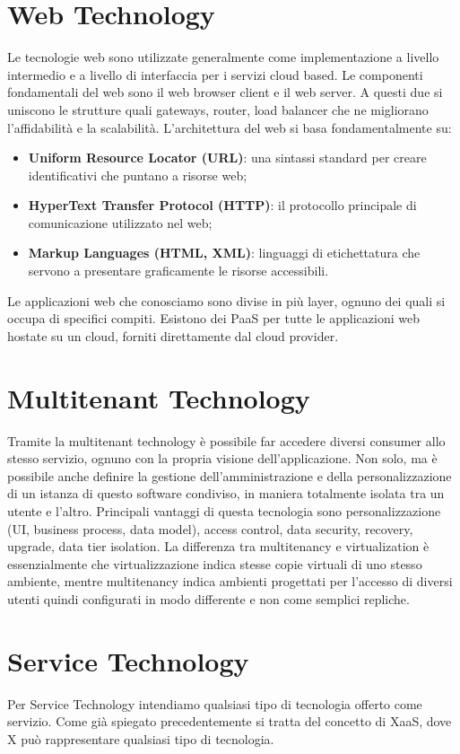 \section{Web Technology}
Le tecnologie web sono utilizzate generalmente come implementazione a livello intermedio e a livello di interfaccia per i servizi cloud based. Le componenti fondamentali del web sono il web browser client e il web server. A questi due si uniscono le strutture quali gateways, router, load balancer che ne migliorano l'affidabilità e la scalabilità. L'architettura del web si basa fondamentalmente su:
\begin{itemize}
    \item \textbf{Uniform Resource Locator (URL)}: una sintassi standard per creare identificativi che puntano a risorse web;
    \item \textbf{HyperText Transfer Protocol (HTTP)}: il protocollo principale di comunicazione utilizzato nel web;
    \item \textbf{Markup Languages (HTML, XML)}: linguaggi di etichettatura che servono a presentare graficamente le risorse accessibili.
\end{itemize}
Le applicazioni web che conosciamo sono divise in più layer, ognuno dei quali si occupa di specifici compiti. Esistono dei PaaS per tutte le applicazioni web hostate su un cloud, forniti direttamente dal cloud provider.

\section{Multitenant Technology}
Tramite la multitenant technology è possibile far accedere diversi consumer allo stesso servizio, ognuno con la propria visione dell'applicazione. Non solo, ma è possibile anche definire la gestione dell'amministrazione e della personalizzazione di un istanza di questo software condiviso, in maniera totalmente isolata tra un utente e l'altro. Principali vantaggi di questa tecnologia sono personalizzazione (UI, business process, data model), access control, data security, recovery, upgrade, data tier isolation. La differenza tra multitenancy e virtualization è essenzialmente che virtualizzazione indica stesse copie virtuali di uno stesso ambiente, mentre multitenancy indica ambienti progettati per l'accesso di diversi utenti quindi configurati in modo differente e non come semplici repliche.

\section{Service Technology}
Per Service Technology intendiamo qualsiasi tipo di tecnologia offerto come servizio. Come già spiegato precedentemente si tratta del concetto di XaaS, dove X può rappresentare qualsiasi tipo di tecnologia.
